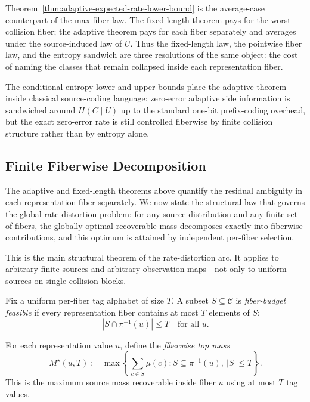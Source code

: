 \begin{remark}
Theorem~\ref{thm:adaptive-expected-rate-lower-bound} is the average-case counterpart of the max-fiber law. The fixed-length theorem pays for the worst collision fiber; the adaptive theorem pays for each fiber separately and averages under the source-induced law of $U$. Thus the fixed-length law, the pointwise fiber law, and the entropy sandwich are three resolutions of the same object: the cost of naming the classes that remain collapsed inside each representation fiber.
\end{remark}

\begin{remark}
The conditional-entropy lower and upper bounds place the adaptive theorem inside classical source-coding language: zero-error adaptive side information is sandwiched around $H(C\mid U)$ up to the standard one-bit prefix-coding overhead, but the exact zero-error rate is still controlled fiberwise by finite collision structure rather than by entropy alone.
\end{remark}

\subsection{Finite Fiberwise Decomposition}\label{sec:fiberwise-decomposition}

The adaptive and fixed-length theorems above quantify the residual ambiguity in each representation fiber separately. We now state the structural law that governs the global rate-distortion problem: for any source distribution and any finite set of fibers, the globally optimal recoverable mass decomposes exactly into fiberwise contributions, and this optimum is attained by independent per-fiber selection.

This is the main structural theorem of the rate-distortion arc. It applies to arbitrary finite sources and arbitrary observation maps---not only to uniform sources on single collision blocks.

\begin{definition}
Fix a uniform per-fiber tag alphabet of size $T$. A subset $S \subseteq \mathcal C$ is \emph{fiber-budget feasible} if every representation fiber contains at most $T$ elements of $S$:
\[
|S \cap \pi^{-1}(u)| \le T \quad \text{for all } u.
\]
\end{definition}

\begin{definition}
For each representation value $u$, define the \emph{fiberwise top mass}
\[
M^\star(u, T) := \max\left\{\sum_{c \in S} \mu(c) : S \subseteq \pi^{-1}(u),\ |S| \le T\right\}.
\]
This is the maximum source mass recoverable inside fiber $u$ using at most $T$ tag values.
\end{definition}

